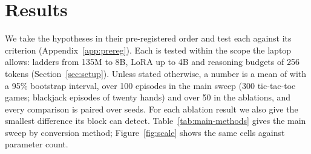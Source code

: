 \section{Results}
\label{sec:results}

We take the hypotheses in their pre-registered order and test each against its criterion (Appendix~\ref{app:prereg}). Each is tested within the scope the laptop allows: ladders from 135M to 8B, LoRA up to 4B and reasoning budgets of 256 tokens (Section~\ref{sec:setup}). Unless stated otherwise, a number is a mean of \norm{} with a 95\% bootstrap interval, over 100 episodes in the main sweep (300 tic-tac-toe games; blackjack episodes of twenty hands) and over 50 in the ablations, and every comparison is paired over seeds. For each ablation result we also give the smallest difference its block can detect. Table~\ref{tab:main-methods} gives the main sweep by conversion method; Figure~\ref{fig:scale} shows the same cells against parameter count.

\begin{table}[t]
  \centering\small
  \caption{Normalized score (random $=0$, oracle $=1$) with 95\% bootstrap intervals for every model and task in the main sweep, one block per conversion method: free-form generation, likelihood scoring and the hidden-state probe on all 28 checkpoints, and LoRA behavior cloning on the 24 checkpoints of at most 4B.}
  \label{tab:main-methods}
\end{table}

